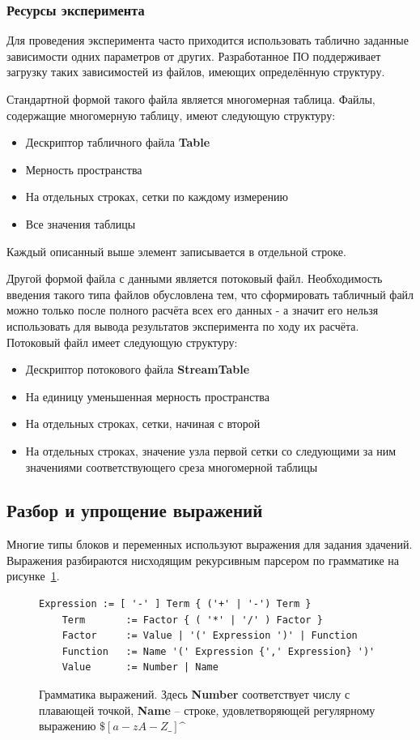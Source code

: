 \subsubsection{Ресурсы эксперимента}
Для проведения эксперимента часто приходится использовать таблично заданные 
зависимости одних параметров от других. Разработанное ПО поддерживает загрузку 
таких зависимостей из файлов, имеющих определённую структуру.

Стандартной формой такого файла является многомерная таблица. Файлы, содержащие 
многомерную таблицу, имеют следующую структуру:
\begin{itemize}
    \item Дескриптор табличного файла \textbf{Table}
    \item Мерность пространства
    \item На отдельных строках, сетки по каждому измерению
    \item Все значения таблицы
\end{itemize}
Каждый описанный выше элемент записывается в отдельной строке.

Другой формой файла с данными является потоковый файл. Необходимость введения 
такого типа файлов обусловлена тем, что сформировать табличный файл можно 
только после полного расчёта всех его данных - а значит его нельзя использовать 
для вывода результатов эксперимента по ходу их расчёта. Потоковый файл имеет 
следующую структуру:
\begin{itemize}
    \item Дескриптор потокового файла \textbf{StreamTable}
    \item На единицу уменьшенная мерность пространства
    \item На отдельных строках, сетки, начиная с второй
    \item На отдельных строках, значение узла первой сетки со следующими за ним 
    значениями соответствующего среза многомерной таблицы
\end{itemize}

\subsection{Разбор и упрощение выражений}
Многие типы блоков и переменных используют выражения для задания здачений. 
Выражения разбираются нисходящим рекурсивным парсером по грамматике на 
рисунке~\ref{fig:grammar}.

\begin{figure}
    \centering
    \begin{lstlisting}[frame=single,numbers=none]
    Expression := [ '-' ] Term { ('+' | '-') Term }
    Term       := Factor { ( '*' | '/' ) Factor }
    Factor     := Value | '(' Expression ')' | Function
    Function   := Name '(' Expression {',' Expression} ')'
    Value      := Number | Name
    \end{lstlisting}
    \caption{Грамматика выражений. Здесь \textbf{Number} соответствует числу с 
        плавающей точкой, \textbf{Name} -- строке, удовлетворяющей регулярному 
        выражению $\$[a-zA-Z\_]\^$}
    \label{fig:grammar}
\end{figure}

